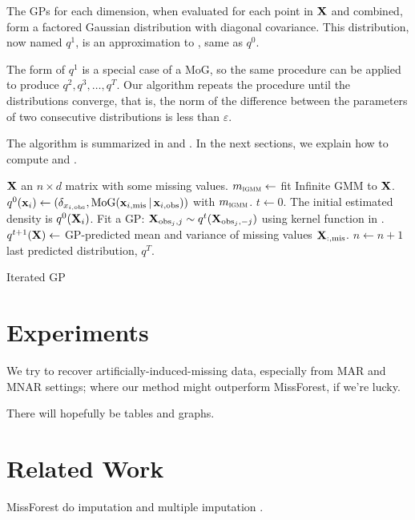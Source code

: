 \documentclass[letterpaper]{article}
\newcommand{\vbar}{\,|\,}
\newcommand{\vx}{{\bf x}}
\newcommand{\vX}{{\bf X}}
\begin{document}
The \acp{GP} for each dimension, when evaluated for each point in $\vX$ and
combined, form a factored Gaussian distribution with diagonal covariance. This
distribution, now named $q^1$, is an approximation to
, same as $q^0$.

The form of $q^1$ is a special case of a \ac{MoG}, so the same procedure can be
applied to produce $q^2, q^3,\dots,q^T$. Our algorithm repeats the procedure
until the distributions converge, that is, the norm of the difference between
the parameters of two consecutive distributions is less than $\varepsilon$.

The algorithm is summarized in  and .
In the next sections, we explain how to compute  and
.

\begin{algorithm}[h]
\begin{algorithmic}
 ${\bf X}$ an $n \times d$ matrix with some missing values.
\State $m_\textsc{igmm} \gets$ fit Infinite \ac{GMM} to $\vX$.
\State $q^0(\vx_i) \gets (\delta_{x_{i,\text{obs}}}, \text{MoG}(\vx_{i,\text{mis}} \vbar \vx_{i,\text{obs}}))$ with $m_\textsc{igmm}$.
\EndFor
\State $t \gets 0$. The initial estimated density is $q^0(\vX_i)$.
\While{$q^t(\vX)$ hasn't yet converged}
    \State Fit a \ac{GP}: $\vX_{\text{obs}_j, j} \sim q^t(\vX_{\text{obs}_j, -j})$
     using kernel function in .
    \State $q^{t+1}(\vX) \gets $ \ac{GP}-predicted mean and variance of missing values
    $\vX_{:,\text{mis}}$.
    \State $n \gets n + 1$
  \EndFor
\EndWhile
\State \Return last predicted distribution, $q^T$.
\end{algorithmic}
\caption{Iterated \acl{GP}}
\label{alg:main-summary}
\end{algorithm}

\section{Experiments}

We try to recover artificially-induced-missing data, especially from MAR and
MNAR settings; where our method might outperform MissForest, if we're lucky. 

There will hopefully be tables and graphs.

\section{Related Work}
MissForest do imputation and multiple imputation \citep{stekhoven2011missforest}.
\end{document}
